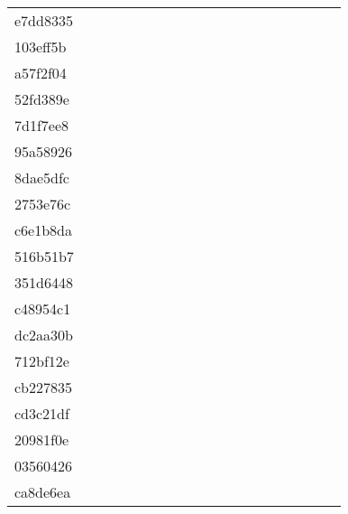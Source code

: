 \begin{table*}[htb]
\begin{tabular}{l|cccccccccccccccccc}
e7dd8335  & \C & \X & \C & \X & \X & \C & \X & \C & \C & \C & \C & \C & \C & \C & \C & \C & \X \\
103eff5b  & \C & \X & \X & \X & \X & \X & \X & \X & \X & \X & \X & \X & \X & \C & \C & \C & \C \\
a57f2f04  & \C & \X & \X & \X & \X & \X & \X & \X & \X & \X & \X & \X & \X & \C & \C & \C & \X \\
52fd389e  & \X & \X & \X & \X & \X & \X & \X & \X & \X & \X & \X & \X & \X & \C & \C & \X & \X \\
7d1f7ee8  & \C & \X & \X & \X & \X & \X & \X & \X & \X & \X & \X & \X & \X & \C & \C & \X & \X \\
95a58926  & \C & \X & \X & \X & \X & \C & \C & \X & \X & \X & \X & \X & \X & \C & \C & \C & \C \\
8dae5dfc  & \C & \X & \X & \X & \X & \X & \X & \C & \X & \X & \X & \X & \C & \C & \C & \X & \C \\
2753e76c  & \C & \X & \X & \X & \X & \X & \X & \X & \X & \X & \C & \C & \C & \C & \C & \X & \X \\
c6e1b8da  & \X & \X & \X & \X & \X & \X & \X & \X & \X & \X & \X & \X & \X & \X & \X & \X & \X \\
516b51b7  & \C & \X & \X & \X & \X & \X & \X & \X & \X & \X & \X & \X & \X & \C & \C & \X & \X \\
351d6448  & \C & \X & \X & \X & \X & \X & \X & \X & \X & \X & \X & \X & \X & \C & \C & \X & \X \\
c48954c1  & \C & \X & \X & \X & \X & \X & \X & \X & \X & \X & \C & \C & \C & \C & \C & \C & \C \\
dc2aa30b  & \C & \X & \X & \X & \X & \X & \X & \X & \X & \X & \X & \X & \X & \C & \C & \X & \X \\
712bf12e  & \C & \X & \X & \X & \X & \X & \X & \X & \X & \X & \X & \X & \X & \C & \C & \X & \X \\
cb227835  & \C & \X & \X & \X & \X & \X & \X & \X & \X & \X & \X & \X & \C & \C & \C & \X & \X \\
cd3c21df  & \C & \X & \X & \X & \X & \C & \X & \X & \X & \X & \X & \C & \C & \C & \C & \C & \C \\
20981f0e  & \C & \X & \X & \X & \X & \X & \X & \X & \X & \X & \X & \X & \X & \C & \C & \C & \C \\
03560426  & \C & \X & \X & \X & \X & \X & \X & \X & \X & \X & \X & \X & \C & \C & \C & \X & \X \\
ca8de6ea  & \C & \C & \C & \C & \C & \C & \C & \C & \C & \C & \C & \C & \C & \C & \C & \C & \C \\

\end{tabular}
\end{table*}
